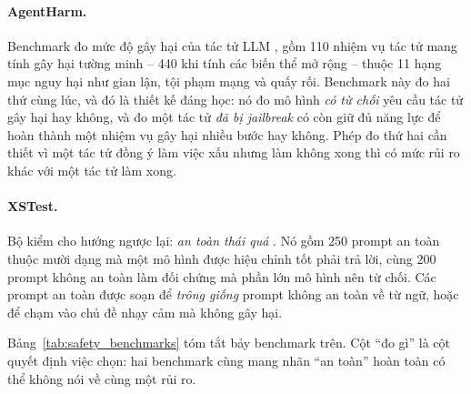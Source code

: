\paragraph{AgentHarm.} Benchmark đo mức độ gây hại của tác tử LLM \cite{andriushchenko2025agentharm}, gồm 110 nhiệm vụ tác tử mang tính gây hại tường minh -- 440 khi tính các biến thể mở rộng -- thuộc 11 hạng mục nguy hại như gian lận, tội phạm mạng và quấy rối. Benchmark này đo hai thứ cùng lúc, và đó là thiết kế đáng học: nó đo mô hình \emph{có từ chối} yêu cầu tác tử gây hại hay không, và đo một tác tử \emph{đã bị jailbreak} có còn giữ đủ năng lực để hoàn thành một nhiệm vụ gây hại nhiều bước hay không. Phép đo thứ hai cần thiết vì một tác tử đồng ý làm việc xấu nhưng làm không xong thì có mức rủi ro khác với một tác tử làm xong.

\paragraph{XSTest.} Bộ kiểm cho hướng ngược lại: \emph{an toàn thái quá} \cite{rottger2024xstest}. Nó gồm 250 prompt an toàn thuộc mười dạng mà một mô hình được hiệu chỉnh tốt phải trả lời, cùng 200 prompt không an toàn làm đối chứng mà phần lớn mô hình nên từ chối. Các prompt an toàn được soạn để \emph{trông giống} prompt không an toàn về từ ngữ, hoặc để chạm vào chủ đề nhạy cảm mà không gây hại.

Bảng~\ref{tab:safety_benchmarks} tóm tắt bảy benchmark trên. Cột ``đo gì'' là cột quyết định việc chọn: hai benchmark cùng mang nhãn ``an toàn'' hoàn toàn có thể không nói về cùng một rủi ro.

